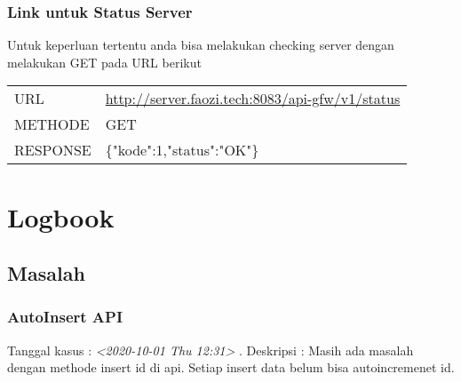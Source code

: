 \documentclass[11pt]{article}
\begin{document}
\subsubsection{Link untuk Status Server}
\label{sec:org1449cdf}
Untuk keperluan tertentu anda bisa melakukan checking server
dengan melakukan GET pada URL berikut
\begin{center}
\begin{tabular}{ll}
URL & \url{http://server.faozi.tech:8083/api-gfw/v1/status}\\
METHODE & GET\\
RESPONSE & \{"kode":1,"status":"OK"\}\\
\end{tabular}
\end{center}

\section{Logbook}
\label{sec:org76cbdf3}
\subsection{Masalah}
\label{sec:org9f011b6}
\subsubsection{AutoInsert API}
\label{sec:org7146d5c}
Tanggal kasus : \textit{<2020-10-01 Thu 12:31> } . 
Deskripsi : Masih ada masalah dengan methode insert id di api. 
Setiap insert data belum bisa autoincremenet id. 
\end{document}
